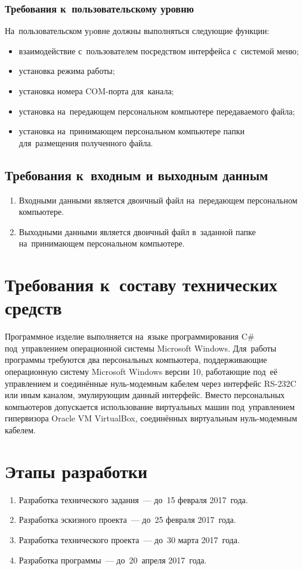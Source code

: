 \documentclass[a4paper,12pt]{article}
\renewcommand{\thesection}{\arabic{section}.}
\renewcommand{\thesubsection}{\thesection\arabic{subsection}.}
\renewcommand*{\theenumi}{\thesection\arabic{enumi}}
\begin{document}
\subsubsection{Требования к~пользовательскому уровню}
На~пользовательском уpовне должны выполняться следующие функции:
\begin{itemize}
\item взаимодействие с~пользователем посредством интерфейса с~системой меню;
\item установка режима работы;
\item установка номера COM-порта для~канала;
\item установка на~передающем персональном компьютере передаваемого файла;
\item установка на~принимающем персональном компьютере папки для~размещения полученного файла.
\end{itemize}

\subsection{Требования к~входным и выходным данным}
\renewcommand*{\theenumi}{\thesubsection\arabic{enumi}}
\begin{enumerate}
\item Входными данными является двоичный файл на~передающем персональном компьютере.
\item Выходными данными является двоичный файл в~заданной папке на~принимающем персональном компьютере.
\end{enumerate}
\renewcommand*{\theenumi}{\thesection\arabic{enumi}}

\section{Требования к~составу технических средств}
Программное изделие выполняется на~языке программирования C\# под~управлением операционной системы Microsoft Windows. Для~работы программы требуются два персональных компьютера, поддерживающие операционную систему Microsoft Windows версии 10, работающие под~её управлением и соединённые нуль-модемным кабелем через интерфейс RS-232C или иным каналом, эмулирующим данный интерфейс. Вместо персональных компьютеров допускается использование виртуальных машин под~управлением гипервизора Oracle VM VirtualBox, соединённых виртуальным нуль-модемным кабелем.

\section{Этапы разработки}
\begin{enumerate}
\item Разработка технического задания~--- до~15 февраля 2017~года.
\item Разработка эскизного проекта~--- до~25 февраля 2017~года.
\item Разработка технического проекта~--- до~30 марта 2017~года.
\item Разработка программы~--- до~20~апреля 2017~года.
\end{enumerate}
\end{document}
